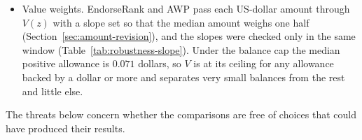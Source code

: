 \begin{itemize}
\item Value weights. EndorseRank and AWP pass each US-dollar amount through $V(z)$ with a slope set so that the median amount weighs one half (Section~\ref{sec:amount-revision}), and the slopes were checked only in the same window (Table~\ref{tab:robustness-slope}). Under the balance cap the median positive allowance is $0.071$ dollars, so $V$ is at its ceiling for any allowance backed by a dollar or more and separates very small balances from the rest and little else.
\end{itemize}


The threats below concern whether the comparisons are free of choices that could have produced their results.

